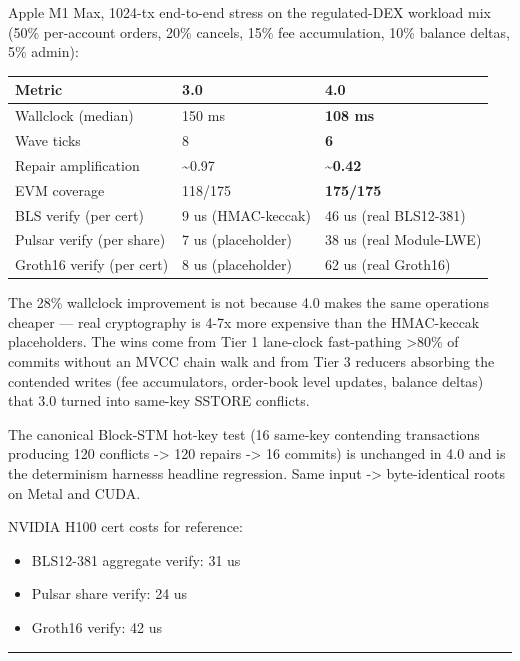 \documentclass[
]{article}
\newcounter{none} %
\providecommand{\tightlist}{%
  \setlength{\itemsep}{0pt}\setlength{\parskip}{0pt}}
\begin{document}
Apple M1 Max, 1024-tx end-to-end stress on the regulated-DEX workload
mix (50\% per-account orders, 20\% cancels, 15\% fee accumulation, 10\%
balance deltas, 5\% admin):

{\def\LTcaptype{none} %
\begin{longtable}[]{@{}lll@{}}
\toprule\noalign{}
Metric & 3.0 & 4.0 \\
\midrule\noalign{}
\endhead
\bottomrule\noalign{}
\endlastfoot
Wallclock (median) & 150 ms & \textbf{108 ms} \\
Wave ticks & 8 & \textbf{6} \\
Repair amplification & \textasciitilde0.97 &
\textbf{\textasciitilde0.42} \\
EVM coverage & 118/175 & \textbf{175/175} \\
BLS verify (per cert) & 9 us (HMAC-keccak) & 46 us (real BLS12-381) \\
Pulsar verify (per share) & 7 us (placeholder) & 38 us (real
Module-LWE) \\
Groth16 verify (per cert) & 8 us (placeholder) & 62 us (real Groth16) \\
\end{longtable}
}

The 28\% wallclock improvement is not because 4.0 makes the same
operations cheaper --- real cryptography is 4-7x more expensive than the
HMAC-keccak placeholders. The wins come from Tier 1 lane-clock
fast-pathing \textgreater80\% of commits without an MVCC chain walk and
from Tier 3 reducers absorbing the contended writes (fee accumulators,
order-book level updates, balance deltas) that 3.0 turned into same-key
SSTORE conflicts.

The canonical Block-STM hot-key test (16 same-key contending
transactions producing 120 conflicts -\textgreater{} 120 repairs
-\textgreater{} 16 commits) is unchanged in 4.0 and is the determinism
harness\textquotesingle s headline regression. Same input
-\textgreater{} byte-identical roots on Metal and CUDA.

NVIDIA H100 cert costs for reference:

\begin{itemize}
\tightlist
\item
  BLS12-381 aggregate verify: 31 us
\item
  Pulsar share verify: 24 us
\item
  Groth16 verify: 42 us
\end{itemize}

\begin{center}\rule{0.5\linewidth}{0.5pt}\end{center}
\end{document}
